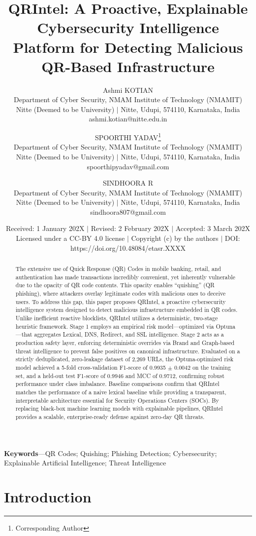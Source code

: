 \documentclass[10pt,twocolumn,letterpaper]{article}
\title{QRIntel: A Proactive, Explainable Cybersecurity Intelligence Platform
for Detecting Malicious QR-Based Infrastructure}
\author{
Ashmi KOTIAN\\
Department of Cyber Security, NMAM Institute of Technology (NMAMIT)\\
Nitte (Deemed to be University) $|$ Nitte, Udupi, 574110, Karnataka, India\\
ashmi.kotian@nitte.edu.in
\and
SPOORTHI YADAV\thanks{Corresponding Author}\\
Department of Cyber Security, NMAM Institute of Technology (NMAMIT)\\
Nitte (Deemed to be University) $|$ Nitte, Udupi, 574110, Karnataka, India\\
spoorthipyadav@gmail.com
\and
SINDHOORA R\\
Department of Cyber Security, NMAM Institute of Technology (NMAMIT)\\
Nitte (Deemed to be University) $|$ Nitte, Udupi, 574110, Karnataka, India\\
sindhoora807@gmail.com
}
\date{Received: 1 January 202X $|$ Revised: 2 February 202X $|$ Accepted:
3 March 202X \\
Licensed under a CC-BY 4.0 license $|$ Copyright (c) by the authors
$|$ DOI: https://doi.org/10.48084/etasr.XXXX}
\begin{document}
\maketitle

\begin{abstract}
The extensive use of Quick Response (QR) Codes in mobile banking, retail,
and authentication has made transactions incredibly convenient, yet inherently
vulnerable due to the opacity of QR code contents. This opacity enables
``quishing'' (QR phishing), where attackers overlay legitimate codes with
malicious ones to deceive users. To address this gap, this paper proposes
QRIntel, a proactive cybersecurity intelligence system designed to detect
malicious infrastructure embedded in QR codes. Unlike inefficient reactive
blocklists, QRIntel utilizes a deterministic, two-stage heuristic framework.
Stage 1 employs an empirical risk model---optimized via Optuna---that
aggregates Lexical, DNS, Redirect, and SSL intelligence. Stage 2 acts as a
production safety layer, enforcing deterministic overrides via Brand and
Graph-based threat intelligence to prevent false positives on canonical
infrastructure. Evaluated on a strictly deduplicated, zero-leakage dataset
of 2,269 URLs, the Optuna-optimized risk model achieved a 5-fold
cross-validation F1-score of 0.9935 $\pm$ 0.0042 on the training set, and
a held-out test F1-score of 0.9946 and MCC of 0.9712, confirming robust
performance under class imbalance. Baseline comparisons confirm that QRIntel
matches the performance of a naive lexical baseline while providing a
transparent, interpretable architecture essential for Security Operations 
Centers (SOCs). By replacing black-box machine learning models with explainable 
pipelines, QRIntel provides a scalable, enterprise-ready defense against 
zero-day QR threats.
\end{abstract}

\noindent \textbf{Keywords}---QR Codes; Quishing; Phishing Detection;
Cybersecurity; Explainable Artificial Intelligence; Threat Intelligence

\section{Introduction}
\end{document}
